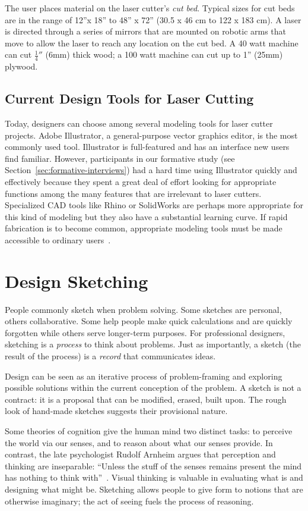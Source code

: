 The user places material on the laser cutter's \textit{cut
  bed}. Typical sizes for cut beds are in the range of 12''x 18'' to
48'' x 72'' (30.5 x 46 cm to 122 x 183 cm). A laser is directed
through a series of mirrors that are mounted on robotic arms that move
to allow the laser to reach any location on the cut bed. A 40 watt
machine can cut $\frac{1}{4}''$ (6mm) thick wood; a 100 watt machine
can cut up to 1'' (25mm) plywood.

\subsection{Current Design Tools for Laser Cutting}

Today, designers can choose among several modeling tools for laser
cutter projects. Adobe Illustrator, a general-purpose vector graphics
editor, is the most commonly used tool. Illustrator is full-featured
and has an interface new users find familiar. However, participants in
our formative study (see Section~\ref{sec:formative-interviews}) had a
hard time using Illustrator quickly and effectively because they spent
a great deal of effort looking for appropriate functions among the
many features that are irrelevant to laser cutters. Specialized CAD
tools like Rhino or SolidWorks are perhaps more appropriate for this
kind of modeling but they also have a substantial learning curve. If
rapid fabrication is to become common, appropriate modeling tools must
be made accessible to ordinary users~\cite{lipson-homefactory}.

\section{Design Sketching}

People commonly sketch when problem solving. Some sketches are
personal, others collaborative. Some help people make quick
calculations and are quickly forgotten while others serve longer-term
purposes. For professional designers, sketching is a \textit{process}
to think about problems. Just as importantly, a sketch (the result of
the process) is a \textit{record} that communicates ideas. 

Design can be seen as an iterative process of problem-framing and
exploring possible solutions within the current conception of the
problem. A sketch is not a contract: it is a proposal that can be
modified, erased, built upon. The rough look of hand-made sketches
suggests their provisional nature.

Some theories of cognition give the human mind two distinct tasks: to
perceive the world via our senses, and to reason about what our senses
provide. In contrast, the late psychologist Rudolf Arnheim argues that
perception and thinking are inseparable: ``Unless the stuff of the
senses remains present the mind has nothing to think
with''~\cite{arnheim-visthink}. Visual thinking is valuable in
evaluating what is and designing what might be. Sketching allows
people to give form to notions that are otherwise imaginary; the act
of seeing fuels the process of reasoning.

